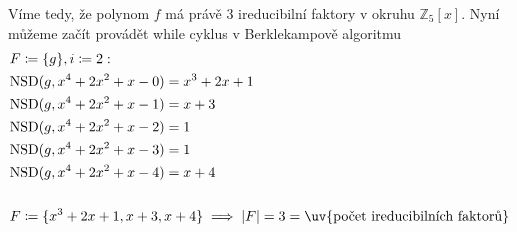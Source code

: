 \documentclass[11pt, a4paper]{article}
\begin{document}
Víme tedy, že polynom $f$ má právě 3 ireducibilní faktory v okruhu $\mathbb{Z}_5[x]$. Nyní můžeme začít provádět while cyklus v Berklekampově algoritmu
\begin{align*}
& F \coloneqq \{g\}, i \coloneqq 2: \\
& \text{NSD}(g, x^4+2x^2+x-0) = x^3+2x+1\\
& \text{NSD}(g, x^4+2x^2+x-1) = x+3\\
& \text{NSD}(g, x^4+2x^2+x-2) = 1\\
& \text{NSD}(g, x^4+2x^2+x-3) = 1\\
& \text{NSD}(g, x^4+2x^2+x-4) = x+4\\\\
& F \coloneqq \{x^3+2x+1, x+3, x+4\} \implies |F|=3=\text{\uv{počet ireducibilních faktorů}}
\end{align*}
\end{document}
